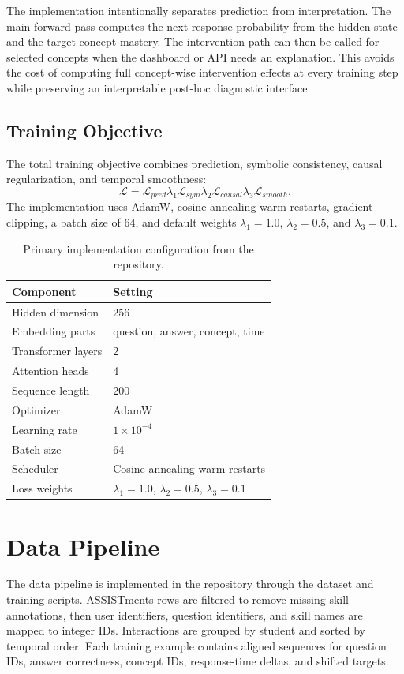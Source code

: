 \documentclass[conference]{IEEEtran}
\begin{document}
The implementation intentionally separates prediction from interpretation. The main forward pass computes the next-response probability from the hidden state and the target concept mastery. The intervention path can then be called for selected concepts when the dashboard or API needs an explanation. This avoids the cost of computing full concept-wise intervention effects at every training step while preserving an interpretable post-hoc diagnostic interface.

\subsection{Training Objective}
The total training objective combines prediction, symbolic consistency, causal regularization, and temporal smoothness:
\begin{equation}
\mathcal{L}=\mathcal{L}_{pred}
\lambda_1\mathcal{L}_{sym}
\lambda_2\mathcal{L}_{causal}
\lambda_3\mathcal{L}_{smooth}.
\end{equation}
The implementation uses AdamW, cosine annealing warm restarts, gradient clipping, a batch size of 64, and default weights $\lambda_1=1.0$, $\lambda_2=0.5$, and $\lambda_3=0.1$.

\begin{table}[t]
\centering
\caption{Primary implementation configuration from the repository.}
\label{tab:config}
\begin{tabular}{ll}
\toprule
Component & Setting \\
\midrule
Hidden dimension & 256 \\
Embedding parts & question, answer, concept, time \\
Transformer layers & 2 \\
Attention heads & 4 \\
Sequence length & 200 \\
Optimizer & AdamW \\
Learning rate & $1\times10^{-4}$ \\
Batch size & 64 \\
Scheduler & Cosine annealing warm restarts \\
Loss weights & $\lambda_1=1.0$, $\lambda_2=0.5$, $\lambda_3=0.1$ \\
\bottomrule
\end{tabular}
\end{table}

\section{Data Pipeline}
The data pipeline is implemented in the repository through the dataset and training scripts. ASSISTments rows are filtered to remove missing skill annotations, then user identifiers, question identifiers, and skill names are mapped to integer IDs. Interactions are grouped by student and sorted by temporal order. Each training example contains aligned sequences for question IDs, answer correctness, concept IDs, response-time deltas, and shifted targets.
\end{document}
